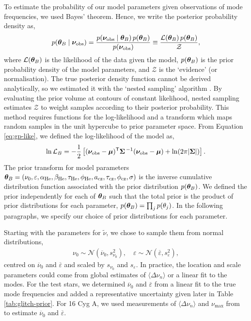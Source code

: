 To estimate the probability of our model parameters given observations of mode frequencies, we used Bayes' theorem. Hence, we write the posterior probability density as, 
%
\begin{equation}
    p(\bm{\theta}_B \mid \bm{\nu}_{{\mathrm{obs}}}) = \frac{p(\bm{\nu}_{{\mathrm{obs}}} \mid \bm{\theta}_B)\,p(\bm{\theta}_B)}{p(\bm{\nu}_{{\mathrm{obs}}})} \equiv \frac{\mathcal{L}(\bm{\theta}_B)\,p(\bm{\theta}_B)}{\mathcal{Z}},
\end{equation}
%
where \(\mathcal{L}(\bm{\theta}_B)\) is the likelihood of the data given the model, \(p(\bm{\theta}_B)\) is the prior probability density of the model parameters, and \(\mathcal{Z}\) is the `evidence' (or normalisation). The true posterior density function cannot be derived analytically, so we estimated it with the `nested sampling' algorithm \citep{Skilling2004}. By evaluating the prior volume at contours of constant likelihood, nested sampling estimates \(\mathcal{Z}\) to weight samples according to their posterior probability. This method requires functions for the log-likelihood and a transform which maps random samples in the unit hypercube to prior parameter space. From Equation \ref{eq:gp-like}, we defined the log-likelihood of the model as,
%
\begin{equation}
    \ln\mathcal{L}_B = - \frac12 \left[ {(\bm{\nu}_{{\mathrm{obs}}} - \bm{\mu})^\mathsf{T} \bm{\Sigma}^{\,-1} (\bm{\nu}_{{\mathrm{obs}}} - \bm{\mu})} + \ln(2 \pi | \bm{\Sigma} | ) \right].
\end{equation}
%
The prior transform for model parameters \(\bm{\theta}_B = (\nu_0, \varepsilon, \alpha_{{\mathrm{He}}}, \beta_{{\mathrm{He}}}, \tau_{{\mathrm{He}}}, \phi_{{\mathrm{He}}}, a_{{\mathrm{cz}}}, \tau_{{\mathrm{cz}}}, \phi_{{\mathrm{cz}}}, \sigma)\) is the inverse cumulative distribution function associated with the prior distribution \(p(\bm{\theta}_B)\). We defined the prior independently for each of \(\bm{\theta}_B\) such that the total prior is the product of prior distributions for each parameter, \(p(\bm{\theta}_B) = \prod_j p(\theta_{j})\). In the following paragraphs, we specify our choice of prior distributions for each parameter.

Starting with the parameters for \(\tilde{\nu}\), we chose to sample them from normal distributions,
%
\begin{gather*}
    \nu_0 \sim \mathcal{N}(\overline{\nu}_0, s_{\nu_0}^2), \quad \varepsilon \sim \mathcal{N}(\overline{\varepsilon}, s_\varepsilon^2),%
\end{gather*}
%
centred on \(\overline{\nu}_0\) and \(\overline{\varepsilon}\) and scaled by \(s_{\nu_0}\) and \(s_\varepsilon\). In practice, the location and scale parameters could come from global estimates of \(\langle\Delta\nu_n\rangle\) or a linear fit to the modes. For the test stars, we determined \(\overline{\nu}_0\) and \(\overline{\varepsilon}\) from a linear fit to the true mode frequencies and added a representative uncertainty given later in Table \ref{tab:glitch-prior}. For 16 Cyg A, we used measurements of \(\langle\Delta\nu_n\rangle\) and \(\nu_{\max}\) from \citet{Lund.SilvaAguirre.ea2017} to estimate \(\overline{\nu}_0\) and \(\overline{\varepsilon}\).

